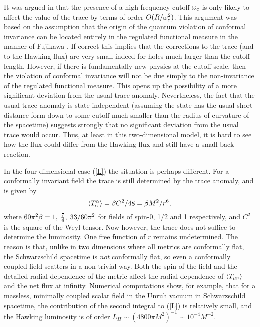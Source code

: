 It was argued in \cite{Jac} that the presence of a high
frequency cutoff $\omega_c$ is only likely to affect the
value of the trace by terms of order $O(R/\omega_c^2)$.
This argument was based on the assumption that the
origin of the quantum violation of conformal invariance
can be located entirely in the regulated functional
measure in the manner of Fujikawa \cite{Fuji}.
If correct this implies that the corrections to the
trace (and to the Hawking flux) are very small indeed for
holes much larger than the cutoff length.
However, if there is fundamentally new physics at the
cutoff scale, then the violation of conformal
invariance will not be due simply to the non-invariance
of the regulated functional measure. This opens up the
possibility of a more significant deviation from the usual
trace anomaly. Nevertheless, the fact that the usual trace
anomaly is state-independent (assuming the state has the usual short
distance form down to some cutoff much smaller than the
radius of curvature of the spacetime) suggests strongly
that no significant deviation from the usual trace would occur.
Thus, at least in this two-dimensional model, it is hard to see
how the flux could differ from the Hawking flux and still have a small
back-reaction.

In the four dimensional case (\ref{L}) the situation is
perhaps different. For a conformally invariant field the trace is
still determined by the trace anomaly, and is given by
\begin{equation}
\langle T_\alpha^\alpha\rangle =\beta C^2/48=\beta M^2/r^6,
\label{trace}
\end{equation}
where $60\pi^2\beta=1,\; {7\over 4},\;
33/60\pi^2$ for fields of spin-0, 1/2 and 1
respectively, and $C^2$ is the square of the Weyl tensor.
Now however, the trace does not suffice to determine the luminosity.
One free function of $r$ remains undetermined.
The reason is that, unlike in two
dimensions where all metrics are conformally flat, the
Schwarzschild spacetime is {\it not} conformally flat,
so even a conformally coupled field scatters in a
non-trivial way. Both the spin of the field and the
detailed radial dependence of the metric affect the
radial dependence of $\langle T_{\mu\nu}\rangle$ and the net
flux at infinity.
Numerical computations \cite{Jensen} show, for example, that for
a massless, minimally coupled scalar field in the Unruh
vacuum in Schwarzschild spacetime,
the contribution of the second integral to (\ref{L})
is relatively small, and the Hawking luminosity is of order
$L_H\sim (4800\pi M^2)^{-1}\sim 10^{-4}M^{-2}$.

